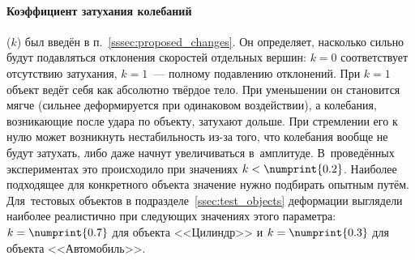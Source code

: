 \documentclass[a4paper, 14pt, titlepage]{extarticle}
\newcommand{\num}[1]{\numprint{#1}}
\begin{document}
      \paragraph{Коэффициент затухания колебаний} ($k$) был введён в п.~\ref{sssec:proposed_changes}.
      Он определяет, насколько сильно будут подавляться отклонения скоростей отдельных вершин: $k = 0$
      соответствует отсутствию затухания, $k = 1$~--- полному подавлению отклонений. При $k = 1$
      объект ведёт себя как абсолютно твёрдое тело. При уменьшении он становится мягче (сильнее
      деформируется при одинаковом воздействии), а колебания, возникающие после удара по объекту,
      затухают дольше. При стремлении его к нулю может возникнуть нестабильность из-за того, что
      колебания вообще не будут затухать, либо даже начнут увеличиваться в~амплитуде. В~проведённых
      экспериментах это происходило при значениях $k < \num{0.2}$. Наиболее подходящее для
      конкретного объекта значение нужно подбирать опытным путём. Для~тестовых объектов
      в подразделе~\ref{ssec:test_objects} деформации выглядели наиболее реалистично при следующих
      значениях этого параметра: $k = \num{0.7}$ для объекта <<Цилиндр>> и $k = \num{0.3}$ для
      объекта <<Автомобиль>>.
\end{document}
